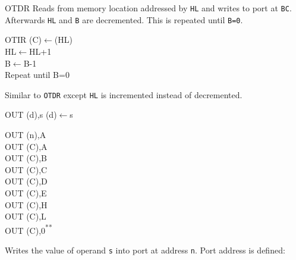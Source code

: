 \documentclass[12pt,twoside,openright,a4paper]{book}
\newcommand{\UNDOC}{\textnormal{\textsuperscript{**}}}
\begin{document}
\begin{basedescript}{
	\desclabelstyle{\multilinelabel}
	\desclabelwidth{3cm}}
\begin{detailitem}{OTDR}
		Reads from memory location addressed by {\tt HL} and writes to port at {\tt BC}. Afterwards {\tt HL} and {\tt B} are decremented. This is repeated until {\tt B=0}.

		\begin{DetailEffects}
		\end{DetailEffects}
				
		\begin{DetailTiming}
			\DetailTime{B=0}{4}{16}
			\DetailTime{B$\not=$0}{5}{21}
		\end{DetailTiming}

	\end{detailitem}

	\begin{detailitem}{OTIR}
		{(C)$\leftarrow$(HL)\\
		HL$\leftarrow$HL+1\\
		B$\leftarrow$B-1\\
		Repeat until B=0}

		Similar to {\tt OTDR} except {\tt HL} is incremented instead of decremented.

		\begin{DetailEffects}
			\DetailFlags{\FU}{1}{\FU}{\FU}{1}{\FN}
		\end{DetailEffects}
				
		\begin{DetailTiming}
		\end{DetailTiming}

	\end{detailitem}

	\begin{detailitem}{OUT (d),s}
		{(d)$\leftarrow$s}

		\begin{DetailVariants}
			OUT (n),A\\
			OUT (C),A\\
			OUT (C),B\\
			OUT (C),C\\
			OUT (C),D\\
			OUT (C),E\\
			OUT (C),H\\
			OUT (C),L\\
			OUT (C),0\UNDOC
		\end{DetailVariants}

		Writes the value of operand {\tt s} into port at address {\tt n}. Port address is defined:


\end{detailitem}
\end{basedescript}
\end{document}
